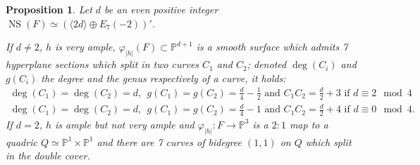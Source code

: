 \documentclass{amsart}
\newtheorem{prop}[thm]{Proposition}
\theoremstyle{definition}
\numberwithin{equation}{section}
\numberwithin{equation}{section} \theoremstyle{definition}
\DeclareMathOperator{\NS}{NS}
\newcommand{\ra}{\rightarrow}
\begin{document}
\begin{prop}\label{prop: proj models '}
Let $d$ be an even positive integer $\NS(F)\simeq (\langle 2d\rangle\oplus E_7(-2))'$. %

If $d\neq  2$, $h$ is very ample, $\varphi_{|h|}(F)\subset\mathbb{P}^{d+1}$ is a smooth surface which admits 7 hyperplane sections which split in two curves $C_1$ and $C_2$; denoted $\deg(C_i)$ and $g(C_i)$ the degree and the genus respectively of a curve, it holds:
$$\begin{array}{l}
\deg(C_1)=\deg(C_2)=d,\ \ g(C_1)=g(C_2)=\frac{d}{4}-\frac{1}{2}\mbox{ and }C_1C_2=\frac{d}{2}+3\mbox{ if }d\equiv 2 \mod 4\\
\deg(C_1)=\deg(C_2)=d,\ \ g(C_1)=g(C_2)=\frac{d}{4}-1\mbox{ and }C_1C_2=\frac{d}{2}+4\mbox{ if }d\equiv 0 \mod 4.
\end{array}
$$
If $d=2$, $h$ is ample but not very ample and $\varphi_{|h|}:F\ra\mathbb{P}^3$ is a $2:1$ map to a quadric $Q\simeq \mathbb{P}^1\times \mathbb{P}^1$ and there are 7  curves of bidegree $(1,1)$ on $Q$ which split in the double cover.
\end{prop}
\end{document}
